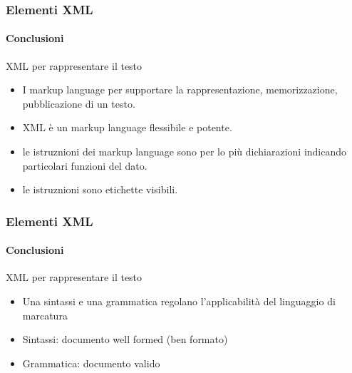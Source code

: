 \begin{frame}
    \frametitle{Elementi XML}
    \framesubtitle{Conclusioni}
    \addtocounter{nframe}{1}

    \begin{block}{XML per rappresentare il testo}
        \begin{itemize}
            \item I markup language per supportare la rappresentazione, memorizzazione, pubblicazione di un testo.
            \item XML è un markup language flessibile e potente.
        \end{itemize}

        \begin{itemize}
            \item le istruznioni dei markup language sono per lo più dichiarazioni indicando particolari funzioni del dato.
            \item le istruznioni sono etichette visibili.
        \end{itemize}
        
    \end{block}

\end{frame}

\begin{frame}
    \frametitle{Elementi XML}
    \framesubtitle{Conclusioni}
    \addtocounter{nframe}{1}

    \begin{block}{XML per rappresentare il testo}
        \begin{itemize}
            \item Una sintassi e una grammatica regolano l'applicabilità del linguaggio di marcatura
            \item Sintassi: documento well formed (ben formato)
            \item Grammatica: documento valido
        \end{itemize}

    \end{block}

\end{frame}


